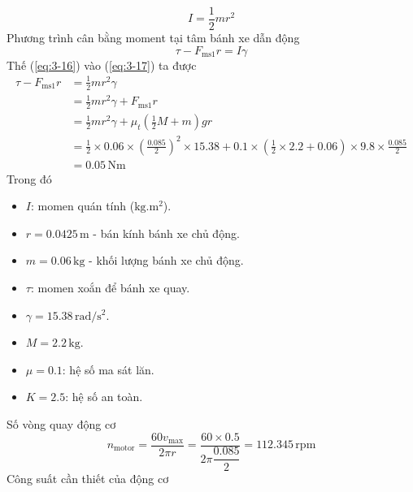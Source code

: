         \begin{equation}
            I = \dfrac{1}{2}mr^2
            \label{eq:3-16}
        \end{equation}
        \hspace*{0.6cm}Phương trình cân bằng moment tại tâm bánh xe dẫn động
        \begin{equation}
            \tau - F_{\text{ms1}} r = I \gamma
            \label{eq:3-17}
        \end{equation}
        Thế (\ref{eq:3-16}) vào (\ref{eq:3-17}) ta được
        \begin{align*}
            \tau - F_{\text{ms1}} r &= \frac{1}{2}mr^2\gamma \\
            &= \frac{1}{2}mr^2\gamma + F_{\text{ms1}}r \\
            &= \frac{1}{2}mr^2\gamma + \mu_t\left(\frac{1}{2}M + m\right)gr \\
            &= \frac{1}{2} \times 0.06 \times \left(\frac{0.085}{2}\right)^2 \times 15.38 + 0.1 \times \left(\frac{1}{2} \times 2.2 + 0.06\right) \times 9.8 \times \frac{0.085}{2} \\
            &= 0.05 \,\text{Nm}
        \end{align*}
        \hspace*{0.6cm}Trong đó
        \begin{itemize}
            \item $I$: momen quán tính ($\mathrm{kg.m^2}$).
            \item $r = 0.0425 \,\mathrm{m}$ - bán kính bánh xe chủ động.
            \item $m = 0.06 \,\mathrm{kg}$ - khối lượng bánh xe chủ động.
            \item $\tau$: momen xoắn để bánh xe quay.
            \item $\gamma = 15.38 \,\mathrm{rad/s^2}$.
            \item $M = 2.2 \,\mathrm{kg}$.
            \item $\mu = 0.1$: hệ số ma sát lăn.
            \item $K = 2.5$: hệ số an toàn.
        \end{itemize}
        \hspace*{0.6cm}Số vòng quay động cơ
        \begin{equation*}
            n_{\text{motor}} = \dfrac{60v_{\text{max}}}{2\pi r} = \dfrac{60 \times 0.5}{2 \pi \dfrac{0.085}{2}} = 112.345 \,\mathrm{rpm}
        \end{equation*}
        \hspace*{0.6cm}Công suất cần thiết của động cơ
